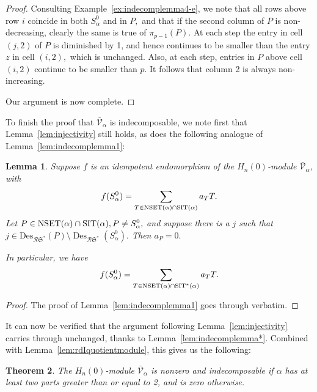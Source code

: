 \documentclass[12pt,letterpaper]{amsart}
\newtheorem{theorem}{Theorem}[section]
\newtheorem{lemma}[theorem]{Lemma}
\theoremstyle{definition}
\newcommand{\rdI}{\mathcal{R}\mathfrak{S}^*}
\DeclareMathOperator{\Des}{Des}
\newcommand{\hn}{H_n(0)}
\begin{document}
\begin{proof}
Consulting Example~\ref{ex:indecomplemma4-e}, we note that all rows above row $i$ coincide in both $S^0_\alpha$ and in $P,$ and  that if the second column of $P$ is non-decreasing, clearly the same is true of $\pi_{p-1}(P).$   At each step the entry in cell $(j,2)$ of $P$ is diminished by 1, and hence continues to be smaller than the entry $z$ in cell $(i,2),$ which is unchanged.  Also, at each step, entries in $P$ above cell $(i,2)$ continue to be smaller than $p.$ It follows that column 2 is always non-increasing. 


Our argument is now complete.
\end{proof}

To finish the proof that $\mathcal{\bar V}_\alpha$ is indecomposable, we note first that Lemma~\ref{lem:injectivity} still holds, as does the following  analogue of Lemma~\ref{lem:indecomplemma1}:

\begin{lemma}\label{lem:indecomplemma1*} Suppose $f$ is an idempotent  endomorphism of the $\hn$-module $\mathcal{\bar V}_\alpha$, with 
\[f(S^0_\alpha)=\sum_{T\in \operatorname{NSET}(\alpha)\cap\operatorname{SIT}(\alpha)} a_T T. \] 
Let $P\in \operatorname{NSET}(\alpha)\cap\operatorname{SIT}(\alpha), P\ne S^0_\alpha,$ and 
suppose there is a $j$ such that $j\in \mathrm{Des}_{\rdI}(P)\setminus\Des_{\rdI}(S^0_\alpha).$
Then $a_P=0.$ 

In particular,  we have 
\[f(S^0_\alpha)=\sum_{T\in \operatorname{NSET}(\alpha)\cap\operatorname{SIT}^*(\alpha)} a_T T.\]
\end{lemma}

\begin{proof} The proof of Lemma~\ref{lem:indecomplemma1} goes through verbatim. \end{proof}


It can now be verified that the argument following Lemma~\ref{lem:injectivity} carries through unchanged,  thanks to Lemma~\ref{lem:indecomplemma*}.  Combined with Lemma~\ref{lem:rdIquotientmodule}, this gives us the following:

\begin{theorem}\label{thm:rdI-ext-quotient-indecomp} The  $\hn$-module $\mathcal{\bar V}_\alpha$ 
is nonzero and indecomposable if $\alpha$ has at least two parts greater than or equal to 2, and is zero otherwise.
\end{theorem}
\end{document}
